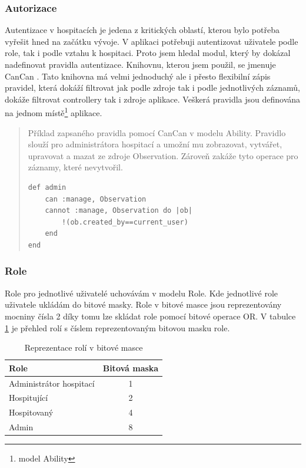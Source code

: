 \subsubsection{Autorizace}
Autentizace v hospitacích je jedena z kritických oblastí, kterou bylo potřeba vyřešit hned na začátku vývoje. V aplikaci potřebuji autentizovat uživatele podle role, tak i podle vztahu k hospitaci. Proto jsem hledal modul, který by dokázal nadefinovat pravidla autentizace. Knihovnu, kterou jsem použil, se jmenuje CanCan \cite{cancan} . Tato knihovna má velmi jednoduchý ale i přesto flexibilní zápis pravidel, která dokáží filtrovat jak podle zdroje tak i podle jednotlivých záznamů, dokáže filtrovat controllery tak i zdroje aplikace.  Veškerá pravidla jsou definována na jednom místě\footnote{model Ability} aplikace.

\begin{quote}
Příklad zapsaného pravidla pomocí CanCan v modelu Ability. Pravidlo slouží pro administrátora hospitací a umožní mu zobrazovat, vytvářet, upravovat a mazat ze zdroje Observation. Zároveň zakáže tyto operace pro záznamy, které nevytvořil.

\begin{verbatim}
def admin
    can :manage, Observation
    cannot :manage, Observation do |ob|
        !(ob.created_by==current_user)
    end
end
\end{verbatim} 
\end{quote}

\subsubsection{Role}
\label{sec:role}
Role pro jednotlivé uživatelé uchovávám v modelu Role. Kde jednotlivé role uživatele ukládám do bitové masky. Role v bitové masce jsou reprezentovány mocniny čísla 2 díky tomu lze skládat role pomocí bitové operace OR. V tabulce \ref{tab:role} je přehled rolí s číslem reprezentovaným bitovou masku role.

\begin{table}[h]
\begin{center}
\begin{tabular}{|l|c|}

\hline
\textbf{Role} & \textbf{Bitová maska} \\ \hline
Administrátor hospitací & 1 \\
Hospitující & 2 \\ 
Hospitovaný & 4 \\
Admin & 8 \\\hline

\end{tabular}
\caption{Reprezentace rolí v bitové masce}
\label{tab:role}
\end{center}
\end{table}


